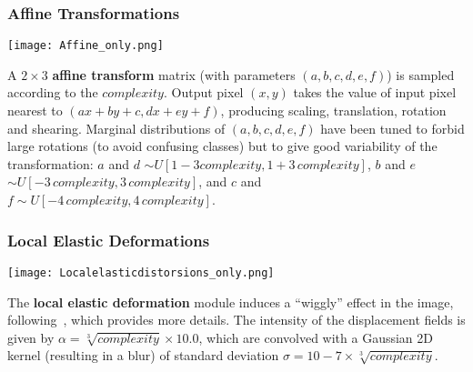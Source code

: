 \documentclass{article} %
\begin{document}

\subsubsection*{Affine Transformations}

\begin{minipage}[b]{0.14\linewidth}
\begin{center}
\texttt{[image: Affine\_only.png]}
\vspace*{6mm}
\end{center}
\end{minipage}%
\hspace{0.3cm}\begin{minipage}[b]{0.86\linewidth}
\noindent A $2 \times 3$ {\bf affine transform} matrix (with
parameters $(a,b,c,d,e,f)$) is sampled according to the $complexity$.
Output pixel $(x,y)$ takes the value of input pixel
nearest to $(ax+by+c,dx+ey+f)$,
producing scaling, translation, rotation and shearing.
Marginal distributions of $(a,b,c,d,e,f)$ have been tuned to
forbid large rotations (to avoid confusing classes) but to give good
variability of the transformation: $a$ and $d$ $\sim U[1-3
complexity,1+3\,complexity]$, $b$ and $e$ $\sim U[-3 \,complexity,3\,
complexity]$, and $c$ and $f \sim U[-4 \,complexity, 4 \,
complexity]$.\\
\end{minipage}

\subsubsection*{Local Elastic Deformations}

\begin{minipage}[b]{0.14\linewidth}
\begin{center}
\vspace*{5mm}
\texttt{[image: Localelasticdistorsions\_only.png]}
\end{center}
\end{minipage}%
\hspace{3mm}
\begin{minipage}[b]{0.85\linewidth}
The {\bf local elastic deformation}
module induces a ``wiggly'' effect in the image, following~\citet{SimardSP03-short},
which provides more details. 
The intensity of the displacement fields is given by 
$\alpha = \sqrt[3]{complexity} \times 10.0$, which are 
convolved with a Gaussian 2D kernel (resulting in a blur) of
standard deviation $\sigma = 10 - 7 \times\sqrt[3]{complexity}$.
\vspace{2mm}
\end{minipage}
\end{document}

